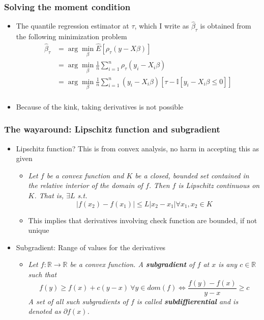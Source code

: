 \documentclass[aspectratio=169]{beamer}
\begin{document}
\begin{frame}
\frametitle{Solving the moment condition}
\begin{itemize}
\item The quantile regression estimator at $\tau$, which I write as $\hat{\beta}_\tau$ is obtained from the following minimization problem
\[
\begin{aligned}
\hat{\beta}_ \tau &= \arg\min_{\beta}  \widehat{E}[\rho_\tau(y-X\beta)]\\
&=\arg\min_{\beta} \frac{1}{n}\sum_{i=1}^n \rho_\tau (y_i-X_i\beta)\\
&=\arg\min_{\beta} \frac{1}{n}\sum_{i=1}^n (y_i-X_i\beta)[\tau-\mathbb{I}[y_i-X_i\beta\leq0]]\\
\end{aligned}
\]
\item Because of the kink, taking derivatives is not possible
\end{itemize}
\end{frame}

\begin{frame}
\frametitle{The wayaround: Lipschitz function and subgradient}
\begin{itemize}
\item Lipschitz function? This is from convex analysis, no harm in accepting this as given
\begin{itemize}
\item \textit{Let $f$ be a convex function and $K$ be a closed, bounded set contained in the relative interior of the domain of $f$. Then $f$ is Lipschitz continuous on $K$. That is, $\exists L$ s.t. 
\[|f(x_2)-f(x_1)|\leq L|x_2-x_1| \forall x_1, x_2\in K\]
}
\item This implies that derivatives involving check function are bounded, if not unique
\end{itemize}
\item Subgradient: Range of values for the derivatives
\begin{itemize}
\item \textit{Let $f:\mathbb{R}\to\mathbb{R}$ be a convex function. A \textbf{subgradient} of $f$ at $x$ is any $c\in\mathbb{R}$ such that
\[
f(y) \geq f(x) + c(y-x)\  \forall y\in dom(f) \iff \frac{f(y)-f(x)}{y-x}\geq c
\]
A set of all such subgradients of $f$ is called \textbf{subdiffierential} and is denoted as $\partial f(x)$.}
\end{itemize}
\end{itemize}
\end{frame}
\end{document}
